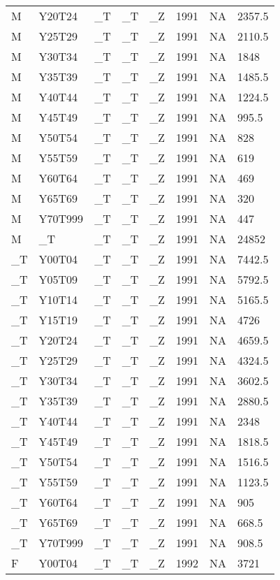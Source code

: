\begin{longtable}[t]{llllllll}
\addlinespace
M & Y20T24 & \_T & \_T & \_Z & 1991 & NA & 2357.5\\
M & Y25T29 & \_T & \_T & \_Z & 1991 & NA & 2110.5\\
M & Y30T34 & \_T & \_T & \_Z & 1991 & NA & 1848\\
M & Y35T39 & \_T & \_T & \_Z & 1991 & NA & 1485.5\\
M & Y40T44 & \_T & \_T & \_Z & 1991 & NA & 1224.5\\
\addlinespace
M & Y45T49 & \_T & \_T & \_Z & 1991 & NA & 995.5\\
M & Y50T54 & \_T & \_T & \_Z & 1991 & NA & 828\\
M & Y55T59 & \_T & \_T & \_Z & 1991 & NA & 619\\
M & Y60T64 & \_T & \_T & \_Z & 1991 & NA & 469\\
M & Y65T69 & \_T & \_T & \_Z & 1991 & NA & 320\\
\addlinespace
M & Y70T999 & \_T & \_T & \_Z & 1991 & NA & 447\\
M & \_T & \_T & \_T & \_Z & 1991 & NA & 24852\\
\_T & Y00T04 & \_T & \_T & \_Z & 1991 & NA & 7442.5\\
\_T & Y05T09 & \_T & \_T & \_Z & 1991 & NA & 5792.5\\
\_T & Y10T14 & \_T & \_T & \_Z & 1991 & NA & 5165.5\\
\addlinespace
\_T & Y15T19 & \_T & \_T & \_Z & 1991 & NA & 4726\\
\_T & Y20T24 & \_T & \_T & \_Z & 1991 & NA & 4659.5\\
\_T & Y25T29 & \_T & \_T & \_Z & 1991 & NA & 4324.5\\
\_T & Y30T34 & \_T & \_T & \_Z & 1991 & NA & 3602.5\\
\_T & Y35T39 & \_T & \_T & \_Z & 1991 & NA & 2880.5\\
\addlinespace
\_T & Y40T44 & \_T & \_T & \_Z & 1991 & NA & 2348\\
\_T & Y45T49 & \_T & \_T & \_Z & 1991 & NA & 1818.5\\
\_T & Y50T54 & \_T & \_T & \_Z & 1991 & NA & 1516.5\\
\_T & Y55T59 & \_T & \_T & \_Z & 1991 & NA & 1123.5\\
\_T & Y60T64 & \_T & \_T & \_Z & 1991 & NA & 905\\
\addlinespace
\_T & Y65T69 & \_T & \_T & \_Z & 1991 & NA & 668.5\\
\_T & Y70T999 & \_T & \_T & \_Z & 1991 & NA & 908.5\\
F & Y00T04 & \_T & \_T & \_Z & 1992 & NA & 3721\\

\end{longtable}
